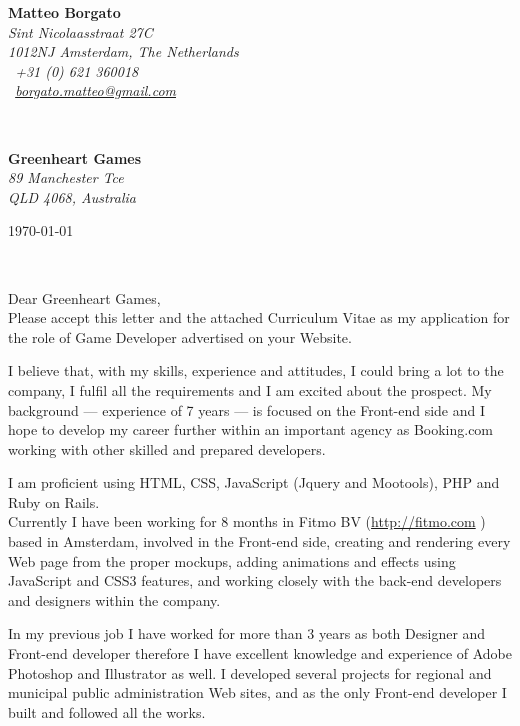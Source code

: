 \documentclass[11pt]{article}
\begin{document}
\sffamily   %
\hfill%
\begin{minipage}[t]{.6\textwidth}
\raggedleft%
{\bfseries Matteo Borgato}\\[.35ex]
\small\itshape%
Sint Nicolaasstraat 27C\\
1012NJ Amsterdam, The Netherlands\\[.35ex]
\Telefon~+31 (0) 621 360018\\
\Letter~\href{mailto:borgato.matteo@gmail.com}{borgato.matteo@gmail.com}
\end{minipage}\\[1em]
%
\begin{minipage}[t]{.4\textwidth}
\raggedright%
{\bfseries Greenheart Games}\\[.35ex]
\small\itshape%
89 Manchester Tce\\
QLD 4068, Australia
\end{minipage}
\hfill %
\begin{minipage}[t]{.4\textwidth}
\raggedleft %
\today
\end{minipage}\\[2em]
\raggedright
Dear Greenheart Games,\\[0.5em]
%
Please accept this letter and the attached Curriculum Vitae as my application for the role of Game Developer advertised on your Website.

I believe that, with my skills, experience and attitudes, I could bring a lot to the company, I fulfil all the requirements and I am excited about the prospect. My background --- experience of 7 years --- is focused on the Front-end side and I hope to develop my career further within an important agency as Booking.com working with other skilled and prepared developers.

I am proficient using HTML, CSS, JavaScript (Jquery and Mootools), PHP and Ruby on Rails. \\
Currently I have been working for 8 months in Fitmo BV (\url{http://fitmo.com} ) based in Amsterdam, involved in the Front-end side, creating and rendering every Web page from the proper mockups, adding animations and effects using JavaScript and CSS3 features, and working closely with the back-end developers and designers within the company.

In my previous job I have worked for more than 3 years as both Designer and Front-end developer therefore I have excellent knowledge and experience of Adobe Photoshop and Illustrator as well. I developed several projects for regional and municipal public administration Web sites, and as the only Front-end developer I built and followed all the works.
\end{document}

